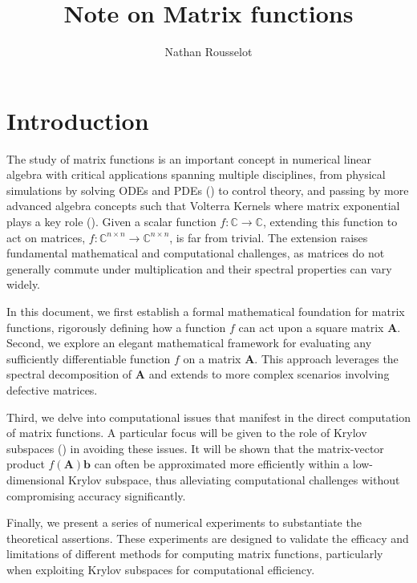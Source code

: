 \documentclass[11pt]{article}
\title{Note on Matrix functions} %
\author{Nathan Rousselot}
\numberwithin{equation}{section}
\begin{document}
\begin{titlingpage}
    \maketitle
\end{titlingpage}
\tableofcontents
\newpage

\section{Introduction}
The study of matrix functions is an important concept in numerical linear algebra with critical applications spanning multiple disciplines, from physical simulations by solving ODEs and PDEs (\cite{higham2008functions}) to control theory, and passing by more advanced algebra concepts such that Volterra Kernels where matrix exponential plays a key role (\cite{burt2017efficient}). Given a scalar function \( f: \mathbb{C} \rightarrow \mathbb{C} \), extending this function to act on matrices, \( f: \mathbb{C}^{n \times n} \rightarrow \mathbb{C}^{n \times n} \), is far from trivial. The extension raises fundamental mathematical and computational challenges, as matrices do not generally commute under multiplication and their spectral properties can vary widely. 

In this document, we first establish a formal mathematical foundation for matrix functions, rigorously defining how a function \( f \) can act upon a square matrix \( \mathbf{A} \). Second, we explore an elegant mathematical framework for evaluating any sufficiently differentiable function \( f \) on a matrix \( \mathbf{A} \). This approach leverages the spectral decomposition of \( \mathbf{A} \) and extends to more complex scenarios involving defective matrices.

Third, we delve into computational issues that manifest in the direct computation of matrix functions. A particular focus will be given to the role of Krylov subspaces (\cite{liesen2013krylov}) in avoiding these issues. It will be shown that the matrix-vector product \( f(\mathbf{A})\mathbf{b} \) can often be approximated more efficiently within a low-dimensional Krylov subspace, thus alleviating computational challenges without compromising accuracy significantly.

Finally, we present a series of numerical experiments to substantiate the theoretical assertions. These experiments are designed to validate the efficacy and limitations of different methods for computing matrix functions, particularly when exploiting Krylov subspaces for computational efficiency.
\end{document}
